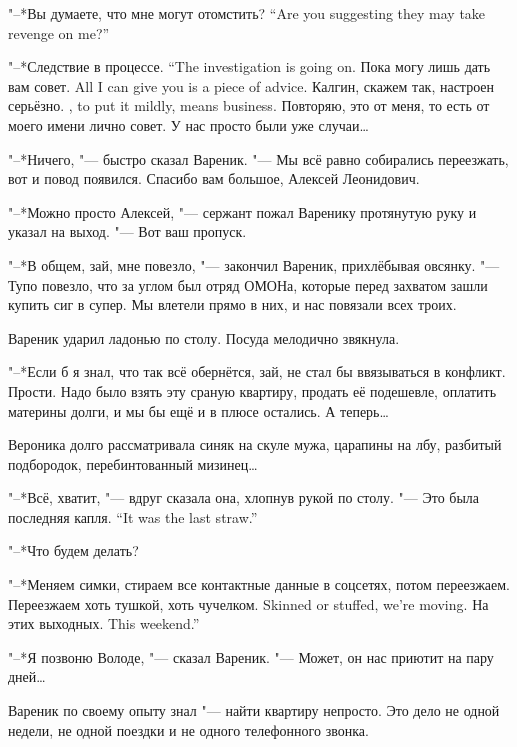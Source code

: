 {"--*Вы думаете, что мне могут отомстить?}
{``Are you suggesting they may take revenge on me?''}

{"--*Следствие в процессе.}
{``The investigation is going on.}
{Пока могу лишь дать вам совет.}
{All I can give you is a piece of advice.}
{Калгин, скажем так, настроен серьёзно.}
{\Kalgin, to put it mildly, means business.}
Повторяю, это от меня, то есть от моего имени лично совет.
У нас просто были уже случаи\ldots{}

"--*Ничего, "--- быстро сказал Вареник.
"--- Мы всё равно собирались переезжать, вот и повод появился.
Спасибо вам большое, Алексей Леонидович.

"--*Можно просто Алексей, "--- сержант пожал Варенику протянутую руку и указал на выход.
"--- Вот ваш пропуск.

\asterism

\textspace

"--*В общем, зай, мне повезло, "--- закончил Вареник, прихлёбывая овсянку.
"--- Тупо повезло, что за углом был отряд ОМОНа, которые перед захватом зашли купить сиг в супер.
Мы влетели прямо в них, и нас повязали всех троих.

Вареник ударил ладонью по столу.
Посуда мелодично звякнула.

"--*Если б я знал, что так всё обернётся, зай, не стал бы ввязываться в конфликт.
Прости.
Надо было взять эту сраную квартиру, продать её подешевле, оплатить материны долги, и мы бы ещё и в плюсе остались.
А теперь\ldots{}

Вероника долго рассматривала синяк на скуле мужа, царапины на лбу, разбитый подбородок, перебинтованный мизинец\ldots{}

"--*Всё, хватит, "--- вдруг сказала она, хлопнув рукой по столу.
{"--- Это была последняя капля.}
{``It was the last straw.''}

"--*Что будем делать?

"--*Меняем симки, стираем все контактные данные в соцсетях, потом переезжаем.
{Переезжаем хоть тушкой, хоть чучелком.}
{Skinned or stuffed, we're moving.}
{На этих выходных.}
{This weekend.''}

"--*Я позвоню Володе, "--- сказал Вареник.
"--- Может, он нас приютит на пару дней\ldots{}

\asterism

\label{Thu_2012_06_07}

Вареник по своему опыту знал "--- найти квартиру непросто.
Это дело не одной недели, не одной поездки и не одного телефонного звонка.

